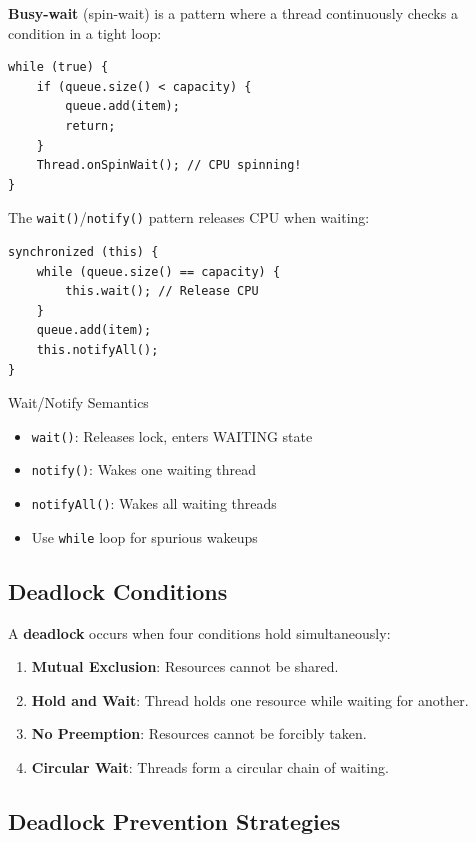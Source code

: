 \documentclass[10pt,a4paper,twocolumn]{article}
\begin{document}
\textbf{Busy-wait} (spin-wait) is a pattern where a thread continuously checks a condition in a tight loop:

\begin{lstlisting}[caption={Busy-Wait Pattern (Inefficient)}]
while (true) {
    if (queue.size() < capacity) {
        queue.add(item);
        return;
    }
    Thread.onSpinWait(); // CPU spinning!
}
\end{lstlisting}

The \texttt{wait()}/\texttt{notify()} pattern releases CPU when waiting:

\begin{lstlisting}[caption={Wait/Notify Pattern (Efficient)}]
synchronized (this) {
    while (queue.size() == capacity) {
        this.wait(); // Release CPU
    }
    queue.add(item);
    this.notifyAll();
}
\end{lstlisting}

\begin{conceptbox}{Wait/Notify Semantics}
\begin{itemize}
    \item \texttt{wait()}: Releases lock, enters WAITING state
    \item \texttt{notify()}: Wakes one waiting thread
    \item \texttt{notifyAll()}: Wakes all waiting threads
    \item Use \texttt{while} loop for spurious wakeups
\end{itemize}
\end{conceptbox}

\subsection{Deadlock Conditions}

A \textbf{deadlock} occurs when four conditions hold simultaneously:

\begin{enumerate}
    \item \textbf{Mutual Exclusion}: Resources cannot be shared.
    \item \textbf{Hold and Wait}: Thread holds one resource while waiting for another.
    \item \textbf{No Preemption}: Resources cannot be forcibly taken.
    \item \textbf{Circular Wait}: Threads form a circular chain of waiting.
\end{enumerate}

\subsection{Deadlock Prevention Strategies}
\end{document}
